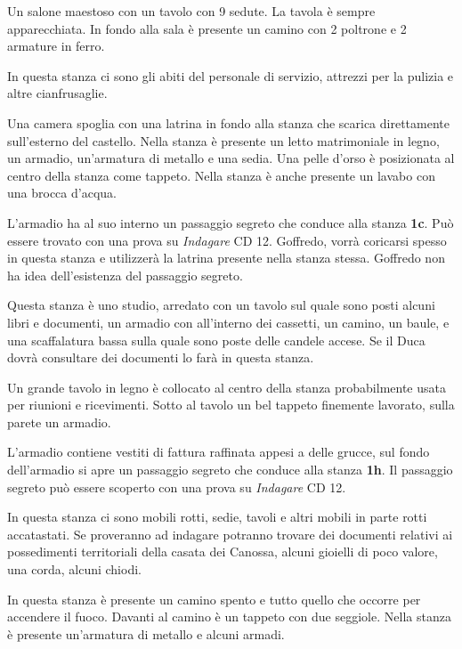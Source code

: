 \documentclass[letterpaper,twocolumn,openany,nodeprecatedcode]{dndbook}
\begin{document}
Un salone maestoso con un tavolo con 9 sedute. La tavola è sempre apparecchiata. In fondo alla sala è presente un camino con 2 poltrone e 2 armature in ferro.

In questa stanza ci sono gli abiti del personale di servizio, attrezzi per la pulizia e altre cianfrusaglie.

\begin{DndReadAloud}
Una camera spoglia con una latrina in fondo alla stanza che scarica direttamente sull'esterno del castello. Nella stanza è presente un letto matrimoniale in legno, un armadio, un'armatura di metallo e una sedia. Una pelle d'orso è posizionata al centro della stanza come tappeto. Nella stanza è anche presente un lavabo con una brocca d'acqua.
\end{DndReadAloud}
L'armadio ha al suo interno un passaggio segreto che conduce alla stanza \textbf{1c}. Può essere trovato con una prova su \textit{Indagare} CD 12. Goffredo, vorrà coricarsi spesso in questa stanza e utilizzerà la latrina presente nella stanza stessa. Goffredo non ha idea dell'esistenza del passaggio segreto.

Questa stanza è uno studio, arredato con un tavolo sul quale sono posti alcuni libri e documenti, un armadio con all'interno dei cassetti, un camino, un baule, e una scaffalatura bassa sulla quale sono poste delle candele accese.
Se il Duca dovrà consultare dei documenti lo farà in questa stanza.

\begin{DndReadAloud}
Un grande tavolo in legno è collocato al centro della stanza probabilmente usata per riunioni e ricevimenti. Sotto al tavolo un bel tappeto finemente lavorato, sulla parete un armadio.
\end{DndReadAloud}
L'armadio contiene vestiti di fattura raffinata appesi a delle grucce, sul fondo dell'armadio si apre un passaggio segreto che conduce alla stanza \textbf{1h}. Il passaggio segreto può essere scoperto con una prova su \textit{Indagare} CD 12.

In questa stanza ci sono mobili  rotti, sedie, tavoli e altri mobili in parte rotti accatastati. Se proveranno ad indagare potranno trovare dei documenti relativi ai possedimenti territoriali della casata dei Canossa, alcuni gioielli di poco valore, una corda, alcuni chiodi.

In questa stanza è presente un camino spento e tutto quello che occorre per accendere il fuoco. Davanti al camino è un tappeto con due seggiole. Nella stanza è presente un'armatura di metallo e alcuni armadi.
\end{document}
